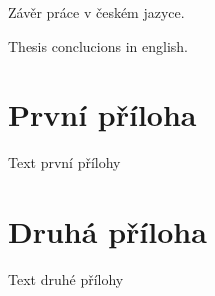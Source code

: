 \documentclass[a4paper,12pt]{article}
\begin{document}
\begin{upconclusions}[czech]
Závěr práce v českém jazyce.
\end{upconclusions}

\begin{upconclusions}[english]
Thesis conclucions in english.
\end{upconclusions}

\upprintbibliography

\upappendix
\section{První příloha}
Text první přílohy

\section{Druhá příloha}
Text druhé přílohy

\upprintindex
\end{document}
